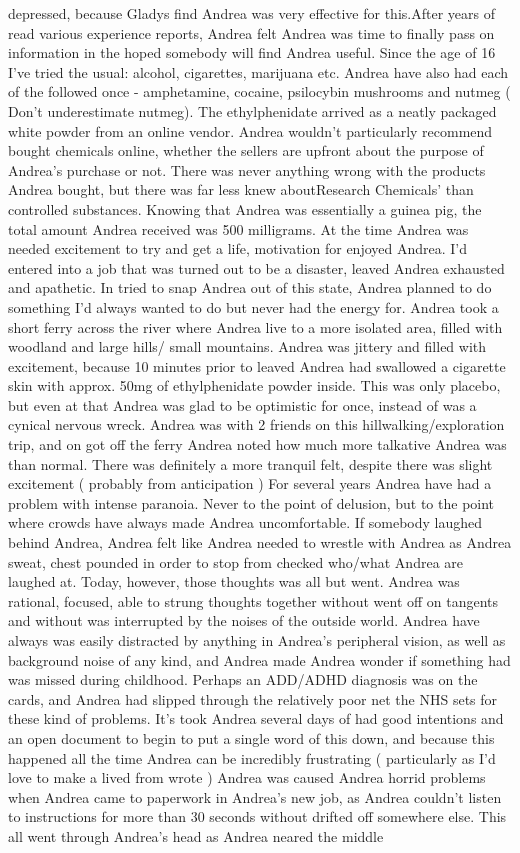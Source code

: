 \documentclass[12pt]{book}
\begin{document}
depressed, because Gladys find Andrea was very effective for this.After years of read various experience reports, Andrea felt Andrea was time to finally pass on information in the hoped somebody will find Andrea useful. Since the age of 16 I've tried the usual: alcohol, cigarettes, marijuana etc. Andrea have also had each of the followed once - amphetamine, cocaine, psilocybin mushrooms and nutmeg ( Don't underestimate nutmeg). The ethylphenidate arrived as a neatly packaged white powder from an online vendor. Andrea wouldn't particularly recommend bought chemicals online, whether the sellers are upfront about the purpose of Andrea's purchase or not. There was never anything wrong with the products Andrea bought, but there was far less knew aboutResearch Chemicals' than controlled substances. Knowing that Andrea was essentially a guinea pig, the total amount Andrea received was 500 milligrams. At the time Andrea was needed excitement to try and get a life, motivation for enjoyed Andrea. I'd entered into a job that was turned out to be a disaster, leaved Andrea exhausted and apathetic. In tried to snap Andrea out of this state, Andrea planned to do something I'd always wanted to do but never had the energy for. Andrea took a short ferry across the river where Andrea live to a more isolated area, filled with woodland and large hills/ small mountains. Andrea was jittery and filled with excitement, because 10 minutes prior to leaved Andrea had swallowed a cigarette skin with approx. 50mg of ethylphenidate powder inside. This was only placebo, but even at that Andrea was glad to be optimistic for once, instead of was a cynical nervous wreck. Andrea was with 2 friends on this hillwalking/exploration trip, and on got off the ferry Andrea noted how much more talkative Andrea was than normal. There was definitely a more tranquil felt, despite there was slight excitement ( probably from anticipation ) For several years Andrea have had a problem with intense paranoia. Never to the point of delusion, but to the point where crowds have always made Andrea uncomfortable. If somebody laughed behind Andrea, Andrea felt like Andrea needed to wrestle with Andrea as Andrea sweat, chest pounded in order to stop from checked who/what Andrea are laughed at. Today, however, those thoughts was all but went. Andrea was rational, focused, able to strung thoughts together without went off on tangents and without was interrupted by the noises of the outside world. Andrea have always was easily distracted by anything in Andrea's peripheral vision, as well as background noise of any kind, and Andrea made Andrea wonder if something had was missed during childhood. Perhaps an ADD/ADHD diagnosis was on the cards, and Andrea had slipped through the relatively poor net the NHS sets for these kind of problems. It's took Andrea several days of had good intentions and an open document to begin to put a single word of this down, and because this happened all the time Andrea can be incredibly frustrating ( particularly as I'd love to make a lived from wrote ) Andrea was caused Andrea horrid problems when Andrea came to paperwork in Andrea's new job, as Andrea couldn't listen to instructions for more than 30 seconds without drifted off somewhere else. This all went through Andrea's head as Andrea neared the middle 
\end{document}
